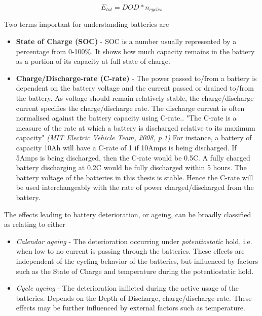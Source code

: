 \begin{equation}
    E_{tot} = DOD * n_{cycles}
    \label{eq:battery_lifetime}
\end{equation}

Two terms important for understanding batteries are
\begin{itemize}
    \item \textbf{State of Charge (SOC)}    -   SOC is a number usually represented by a percentage from 0-100\%. It shows how much capacity remains in the battery as a portion of its capacity at full state of charge.
    \item \textbf{Charge/Discharge-rate (C-rate)}    -   The power passed to/from a battery is dependent on the battery voltage and the current passed or drained to/from the battery. As voltage should remain relatively stable, the charge/discharge current specifies the charge/discharge rate. The discharge current is often normalised against the battery capacity using C-rate.\cite{MIT_Electric_Vehicle_Team2008-vm}. "The C-rate is a measure of the rate at which a  battery is discharged relative to its maximum capacity" \textit{(MIT Electric Vehicle Team, 2008, p.1)}\cite{MIT_Electric_Vehicle_Team2008-vm}  For instance, a battery of capacity 10Ah will have a C-rate of 1 if 10Amps is being discharged. If 5Amps is being discharged, then the C-rate would be 0.5C. A fully charged battery discharging at 0.2C would be fully discharged within 5 hours. The battery voltage of the batteries in this thesis is stable. Hence the C-rate will be used interchangeably with the rate of power charged/discharged from the battery.
\end{itemize}



The effects leading to  battery deterioration, or ageing, can be broadly classified as relating to either 
\begin{itemize}
    \item \textit{Calendar ageing}  -   The deterioration occurring under \textit{potentiostatic} hold, i.e. when low to no current is passing through the batteries. These effects are independent of the cycling behavior of the batteries, but influenced by factors such as the State of Charge and temperature during the potentiostatic hold. 
    \item \textit{Cycle ageing}  -   The deterioration inflicted during the active usage of the batteries. Depends on the Depth of Discharge, charge/discharge-rate. These effects may be further influenced by external factors such as temperature. 
\end{itemize}

